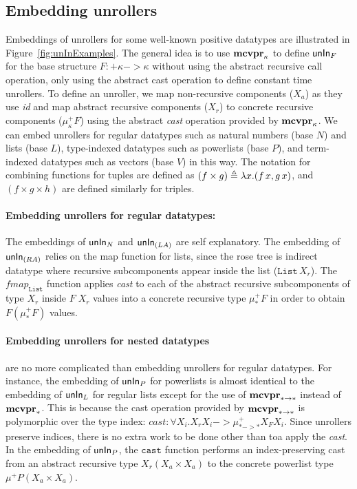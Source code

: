 \subsection{Embedding unrollers}
\label{sec:fixi:cv:unInExamples}
Embeddings of unrollers for some well-known positive datatypes
are illustrated in Figure~\ref{fig:unInExamples}. The general idea is to
use $\mathbf{mcvpr}_\kappa$ to define $\mathsf{unIn}_F$ for the base structure
$F:+\kappa -> \kappa$ without using the abstract recursive call operation,
only using the abstract cast operation to define constant time unrollers.
To define an unroller, we map non-recursive components ($X_a$) as they use
\textit{id} and map abstract recursive components ($X_r$)
to concrete recursive components ($\mu^{+}_\kappa F$) using
the abstract \textit{cast} operation provided by $\mathbf{mcvpr}_\kappa$.
We can embed unrollers for regular datatypes such as natural numbers
(base $N$) and lists (base $L$), type-indexed datatypes
such as powerlists (base $P$), and term-indexed datatypes
such as vectors (base $V$) in this way.
The notation for combining functions for tuples are defined as
$(f \times g) \triangleq \lambda x.(f\,x,g\,x)$, and $(f\times g\times h)$
are defined similarly for triples.

\paragraph{Embedding unrollers for regular datatypes:}
The embeddings of $\mathsf{unIn}_N$ and $\mathsf{unIn}_{(L A)}$ are self explanatory.
The embedding of $\mathsf{unIn}_{(R A)}$ relies on the map function for lists,
since the rose tree is indirect datatype where recursive subcomponents
appear inside the list ($\texttt{List}\,X_r$).
The $\textit{fmap}_\texttt{List}$ function applies \textit{cast} to each of
the abstract recursive subcomponents of type $X_r$ inside $F\;X_r$
values into a concrete recursive type $\mu_{*}^{+}F$ in order to obtain
$F(\mu_{*}^{+}F)$ values.

\paragraph{Embedding unrollers for nested datatypes} are no more complicated
than embedding unrollers for regular datatypes. For instance, the embedding of
$\mathsf{unIn}_P$ for powerlists is almost identical to the embedding of $\mathsf{unIn}_L$ for
regular lists except for the use of $\mathbf{mcvpr}_{* -> *}$ instead of $\mathbf{mcvpr}_{*}$.
This is because the cast operation provided by $\mathbf{mcvpr}_{* -> *}$ is polymorphic
over the type index:
$\textit{cast}:\forall X_i. X_r X_i -> \mu^{+}_{* -> *} X_F X_i$.
Since unrollers preserve indices, there is no extra work to be done
other than toa apply the \textit{cast}. In the embedding of $\mathsf{unIn}_P$,
the $\texttt{cast}$ function performs an index-preserving cast from
an abstract recursive type $X_r (X_a\times X_a)$ to the concrete powerlist type 
$\mu^{+}P (X_a\times X_a)$.

